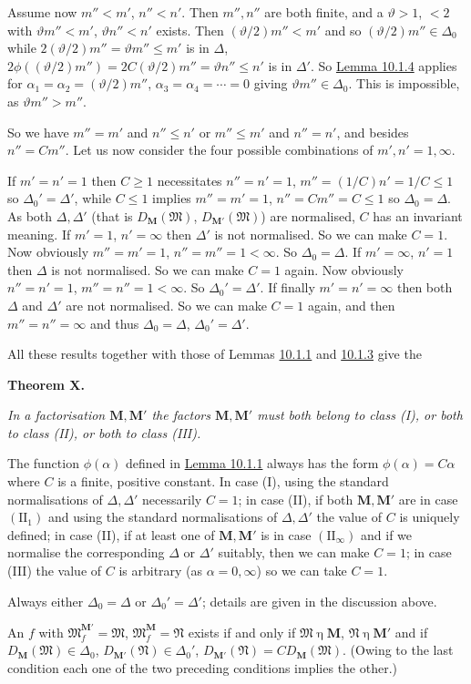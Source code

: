 \documentclass[12pt,b5paper,twoside]{article}
\newcommand{\M}{\mathbf M}
\newcommand{\MainTheorem}[1]{%
  \par\smallskip\noindent\phantomsection\label{thm:#1}\textbf{Theorem #1.}\enspace
}
\newcommand{\lemref}[1]{\hyperref[lem:#1]{Lemma #1}}
\begin{document}
Assume now $m''<m'$, $n''<n'$. Then $m'',n''$ are both finite, and a
$\vartheta>1$, $<2$ with $\vartheta m''<m'$,
$\vartheta n''<n'$ exists. Then $(\vartheta/2)m''<m'$ and so
$(\vartheta/2)m''\in\Delta_0$ while $2(\vartheta/2)m''=\vartheta m''\leq m'$ is in
$\Delta$, $2\phi((\vartheta/2)m'')=2C(\vartheta/2)m''
=\vartheta n''\leq n'$ is in $\Delta'$. So \lemref{10.1.4} applies for
$\alpha_1=\alpha_2=(\vartheta/2)m''$,
$\alpha_3=\alpha_4=\cdots=0$ giving $\vartheta m''\in\Delta_0$. This is
impossible, as $\vartheta m''>m''$.

So we have $m''=m'$ and $n''\leq n'$ or $m''\leq m'$ and $n''=n'$, and
besides $n''=Cm''$. Let us now consider the four possible combinations of
$m',n'=1,\infty$.

If $m'=n'=1$ then $C\geq1$ necessitates $n''=n'=1$,
$m''=(1/C)n'=1/C\leq1$ so $\Delta_0'=\Delta'$, while $C\leq1$ implies
$m''=m'=1$, $n''=Cm''=C\leq1$ so $\Delta_0=\Delta$. As both
$\Delta,\Delta'$ (that is $D_{\M}(\mathfrak M)$,
$D_{\M'}(\mathfrak M)$) are normalised, $C$ has an invariant meaning.
If $m'=1$, $n'=\infty$ then $\Delta'$ is not normalised. So we can make
$C=1$. Now obviously $m''=m'=1$, $n''=m''=1<\infty$. So
$\Delta_0=\Delta$. If $m'=\infty$, $n'=1$ then $\Delta$ is not
normalised. So we can make $C=1$ again. Now obviously
$n''=n'=1$, $m''=n''=1<\infty$. So $\Delta_0'=\Delta'$. If finally
$m'=n'=\infty$ then both $\Delta$ and $\Delta'$ are not normalised. So we
can make $C=1$ again, and then $m''=n''=\infty$ and thus
$\Delta_0=\Delta$, $\Delta_0'=\Delta'$.

All these results together with those of Lemmas
\hyperref[lem:10.1.1]{10.1.1} and \hyperref[lem:10.1.3]{10.1.3} give the

\MainTheorem{X}
{\itshape
In a factorisation $\M,\M'$ the factors $\M,\M'$ must both belong to class
(I), or both to class (II), or both to class (III).

The function $\phi(\alpha)$ defined in \lemref{10.1.1} always has the form
$\phi(\alpha)=C\alpha$ where $C$ is a finite, positive constant. In case
(I), using the standard normalisations of $\Delta,\Delta'$ necessarily
$C=1$; in case (II), if both $\M,\M'$ are in case $(\mathrm{II}_1)$ and
using the standard normalisations of $\Delta,\Delta'$ the value of $C$ is
uniquely defined; in case (II), if at least one of $\M,\M'$ is in case
$(\mathrm{II}_\infty)$ and if we normalise the corresponding $\Delta$ or
$\Delta'$ suitably, then we can make $C=1$; in case (III) the value of $C$
is arbitrary (as $\alpha=0,\infty$) so we can take $C=1$.

Always either $\Delta_0=\Delta$ or $\Delta_0'=\Delta'$; details are given
in the discussion above.

An $f$ with $\mathfrak M_f^{\M'}=\mathfrak M$,
$\mathfrak M_f^{\M}=\mathfrak N$ exists if and only if
$\mathfrak M\mathbin\eta\M$, $\mathfrak N\mathbin\eta\M'$ and if
$D_{\M}(\mathfrak M)\in\Delta_0$,
$D_{\M'}(\mathfrak N)\in\Delta_0'$,
$D_{\M'}(\mathfrak N)=CD_{\M}(\mathfrak M)$. (Owing to the last condition
each one of the two preceding conditions implies the other.)}
\end{document}
